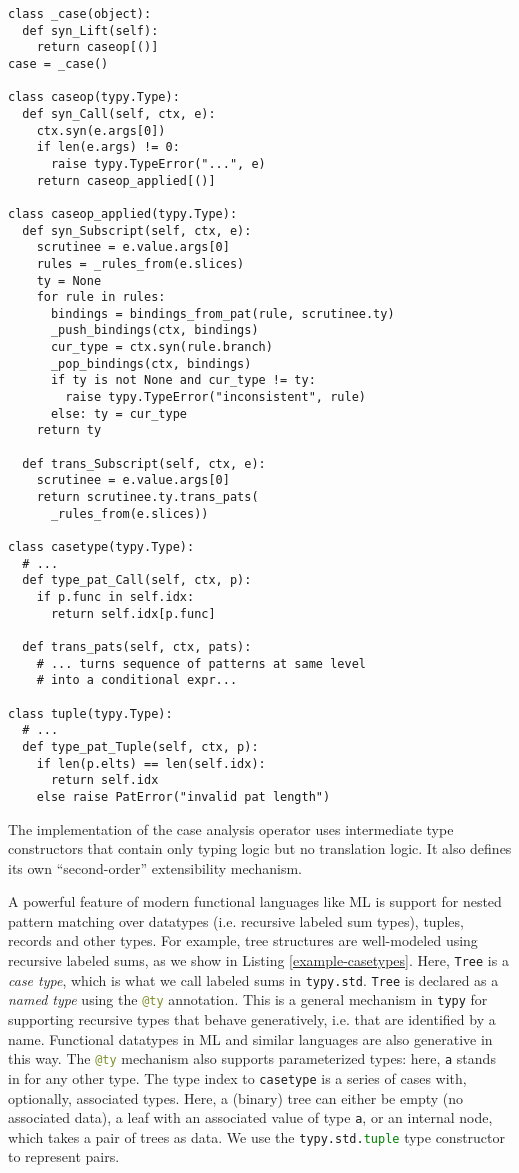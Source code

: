 \documentclass{sigplanconf}
\newcommand{\lip}[1]{\lstinline[language=Python,basicstyle=\ttfamily\small,deletendkeywords={tuple,buffer,map}]{#1}}
\begin{document}
\begin{codelisting}[t]
\begin{lstlisting}
class _case(object):
  def syn_Lift(self):
    return caseop[()]
case = _case()

class caseop(typy.Type):
  def syn_Call(self, ctx, e):
    ctx.syn(e.args[0])
    if len(e.args) != 0:
      raise typy.TypeError("...", e)
    return caseop_applied[()]

class caseop_applied(typy.Type):
  def syn_Subscript(self, ctx, e):
    scrutinee = e.value.args[0]
    rules = _rules_from(e.slices)
    ty = None
    for rule in rules:
      bindings = bindings_from_pat(rule, scrutinee.ty)
      _push_bindings(ctx, bindings)
      cur_type = ctx.syn(rule.branch)
      _pop_bindings(ctx, bindings)
      if ty is not None and cur_type != ty:
        raise typy.TypeError("inconsistent", rule)
      else: ty = cur_type
    return ty

  def trans_Subscript(self, ctx, e):
    scrutinee = e.value.args[0]
    return scrutinee.ty.trans_pats(
      _rules_from(e.slices))

class casetype(typy.Type):
  # ...
  def type_pat_Call(self, ctx, p):
    if p.func in self.idx: 
      return self.idx[p.func]

  def trans_pats(self, ctx, pats):
    # ... turns sequence of patterns at same level 
    # into a conditional expr...

class tuple(typy.Type):
  # ...
  def type_pat_Tuple(self, ctx, p):
    if len(p.elts) == len(self.idx):
      return self.idx
    else raise PatError("invalid pat length") 
\end{lstlisting}
\caption{The implementation of the case analysis operator uses intermediate type constructors that contain only typing logic but no translation logic. It also defines its own ``second-order'' extensibility mechanism.}
\label{example-casetypes-impl}
\end{codelisting}
A powerful feature of modern functional languages like ML is support for nested pattern matching over datatypes (i.e. recursive labeled sum types), tuples, records and other types. For example, tree structures are well-modeled using recursive labeled sums, as we show in Listing \ref{example-casetypes}. Here, \lip{Tree} is a \emph{case type}, which is what we call labeled sums in \lip{typy.std}. \lip{Tree} is declared as a \emph{named type} using the \lip{@ty} annotation. This is a general mechanism in \lip{typy} for supporting recursive types that behave generatively, i.e. that are identified by a name. Functional datatypes in ML and similar languages are also generative in this way. The \lip{@ty} mechanism also supports parameterized types: here, \lip{a} stands in for any other type. The type index to \lip{casetype} is a series of cases with, optionally, associated types. Here, a (binary) tree can either be empty (no associated data), a leaf with an associated value of type \lip{a}, or an internal node, which takes a pair of trees as data. We use the \lip{typy.std.tuple} type constructor to represent pairs.
\end{document}
